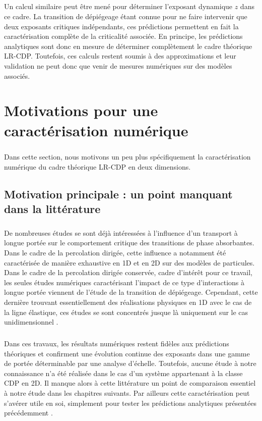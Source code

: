\subparagraph{}Un calcul similaire peut être mené pour déterminer l'exposant dynamique $z$ dans ce cadre. La transition de dépiégeage étant connue pour ne faire intervenir que deux exposants critiques indépendants, ces prédictions permettent en fait la caractérisation complète de la criticalité associée. En principe, les prédictions analytiques sont donc en mesure de déterminer complètement le cadre théorique LR-CDP. Toutefois, ces calculs restent soumis à des approximations et leur validation ne peut donc que venir de mesures numériques sur des modèles associés.

\section{Motivations pour une caractérisation numérique}

\subparagraph{}Dans cette section, nous motivons un peu plus spécifiquement la caractérisation numérique du cadre théorique LR-CDP en deux dimensions.

\subsection{Motivation principale : un point manquant dans la littérature}

\subparagraph{}De nombreuses études se sont déjà intéressées à l'influence d'un transport à longue portée sur le comportement critique des transitions de phase absorbantes. Dans le cadre de la percolation dirigée, cette influence a notamment été caractérisée de manière exhaustive en 1D \cite{hinrichsen_model_1999, hinrichsen_non_equilibrium_2007} et en 2D \cite{dos_santos_crossover_2018} sur des modèles de particules. Dans le cadre de la percolation dirigée conservée, cadre d'intérêt pour ce travail, les seules études numériques caractérisant l'impact de ce type d'interactions à longue portée viennent de l'étude de la transition de dépiégeage. Cependant, cette dernière trouvant essentiellement des réalisations physiques en 1D avec le cas de la ligne élastique, ces études se sont concentrés jusque là uniquement sur le cas unidimensionnel \cite{le_priol_long_range_2020, tanguy_individual_1998, rosso_roughness_2002, ramanathan_onset_1998}.

\subparagraph{}Dans ces travaux, les résultats numériques restent fidèles aux prédictions théoriques et confirment une évolution continue des exposants dans une gamme de portée déterminable par une analyse d'échelle. Toutefois, aucune étude à notre connaissance n'a été réalisée dans le cas d'un système appartenant à la classe CDP en 2D. Il manque alors à cette littérature un point de comparaison essentiel à notre étude dans les chapitres suivants. Par ailleurs cette caractérisation peut s'avérer utile en soi, simplement pour tester les prédictions analytiques présentées précédemment \cite{le_doussal_two_loop_2002}.

